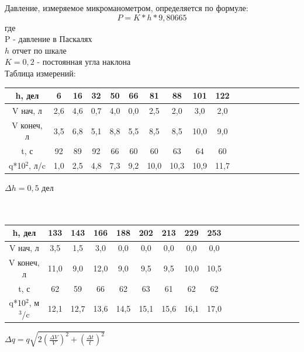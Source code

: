 \documentclass[11pt]{article}
\begin{document}
Давление, измеряемое микроманометром, определяется по формуле:
$$P=K*h*9,80665$$
где \\
P - давление в Паскалях \\
$h$ отчет по шкале\\
$K=0,2$ - постоянная угла наклона\\
Таблица измерений:\\
\begin{tabular}{|c|c|c|c|c|c|c|c|c|c|c|c|c|c|c|c|c|c|}
\hline 
h, дел & 6 & 16 & 32 & 50 & 66 & 81 & 88 & 101 & 122  \\ 
\hline 
V нач, л & 2,6 & 4,6 & 0,7 & 4,0 & 0,0 & 2,5 & 2,0 & 3,0 & 2,0  \\ 
\hline 
V конеч, л & 3,5 & 6,8 & 5,1 & 8,8 & 5,5 & 8,5 & 8,5 & 10,0 & 9,0  \\ 
\hline 
t, с & 92 & 89 & 92 & 66 & 60 & 60 & 63 & 64 & 60  \\ 
\hline 
q*10$^2$, л/c & 1,0 & 2,5 & 4,8 & 7,3 & 9,2 & 10,0 & 10,3 & 10,9 & 11,7  \\ 
\hline 
\end{tabular} $\Delta h = 0,5$ дел
\ \\
\ \\
\ \\
\begin{tabular}{|c|c|c|c|c|c|c|c|c|c|c|c|c|c|c|c|c|c|}
\hline 
h, дел & 133 & 143 & 166 & 188 & 202 & 213 & 229 & 253 \\ 
\hline 
V нач, л  & 3,5 & 1,5 & 3,0 & 0,0 & 0,0 & 0,0 & 0,0 & 0,0 \\ 
\hline 
V конеч, л  & 11,0 & 9,0 & 12,0 & 9,0 & 9,5 & 9,5 & 10,0 & 10,5 \\ 
\hline 
t, с  & 62 & 59 & 66 & 62 & 63 & 61 & 62 & 62 \\ 
\hline 
q*10$^2$, м$^3$/c & 12,1 & 12,7 & 13,6 & 14,5 & 15,1 & 15,6 & 16,1 & 17,0 \\ 
\hline 
\end{tabular}  $\Delta q =q\sqrt{2(\frac{\Delta V}{V})^2+(\frac{\Delta t}{t})^2}$ 
\ \\
\ \\
\end{document}
